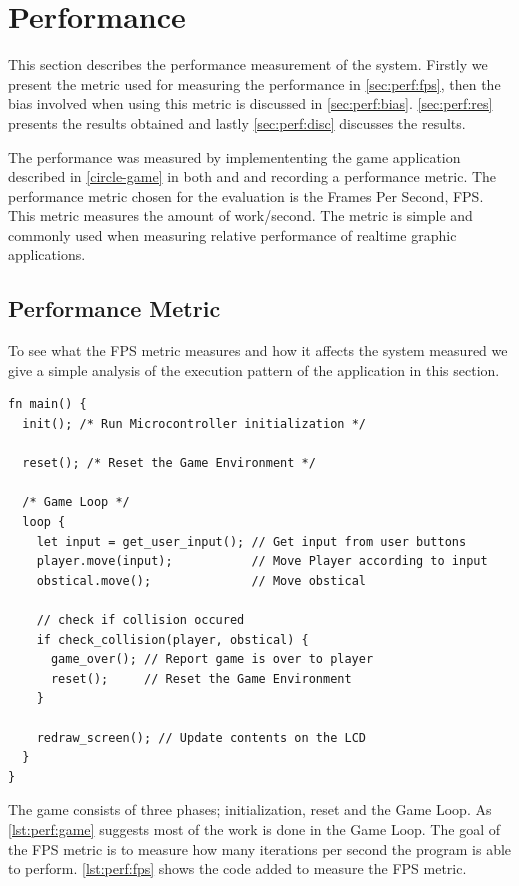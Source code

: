\section{Performance}

This section describes the performance measurement of the system.
Firstly we present the metric used for measuring the performance in \autoref{sec:perf:fps}, then the bias involved when using this metric is discussed in \autoref{sec:perf:bias}.
\autoref{sec:perf:res} presents the results obtained and lastly \autoref{sec:perf:disc} discusses the results.

The performance was measured by implemententing the game application described in \autoref{circle-game} in both {\C} and {\rust} and recording a performance metric.
The performance metric chosen for the evaluation is the Frames Per Second, FPS.
This metric measures the amount of work/second.
The metric is simple and commonly used when measuring relative performance of realtime graphic applications.

\subsection{Performance Metric}
\label{sec:perf:fps}
To see what the FPS metric measures and how it affects the system measured we give a simple analysis of the execution pattern of the application in this section.

\begin{listing}[H]
  \begin{verbatim}
fn main() {
  init(); /* Run Microcontroller initialization */

  reset(); /* Reset the Game Environment */

  /* Game Loop */
  loop {
    let input = get_user_input(); // Get input from user buttons
    player.move(input);           // Move Player according to input
    obstical.move();              // Move obstical

    // check if collision occured
    if check_collision(player, obstical) {
      game_over(); // Report game is over to player
      reset();     // Reset the Game Environment
    }

    redraw_screen(); // Update contents on the LCD
  }
}
  \end{verbatim}
  \caption{}
  \label{lst:perf:game}
\end{listing}

The game consists of three phases; initialization, reset and the Game Loop.
As \autoref{lst:perf:game} suggests most of the work is done in the Game Loop.
The goal of the FPS metric is to measure how many iterations per second the program is able to perform.
\autoref{lst:perf:fps} shows the code added to measure the FPS metric.

